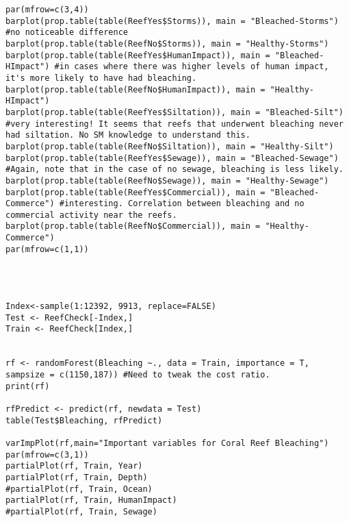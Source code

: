 \documentclass{article}
\begin{document}
\begin{verbatim}
par(mfrow=c(3,4))
barplot(prop.table(table(ReefYes$Storms)), main = "Bleached-Storms") #no noticeable difference
barplot(prop.table(table(ReefNo$Storms)), main = "Healthy-Storms")
barplot(prop.table(table(ReefYes$HumanImpact)), main = "Bleached-HImpact") #in cases where there was higher levels of human impact, it's more likely to have had bleaching.
barplot(prop.table(table(ReefNo$HumanImpact)), main = "Healthy-HImpact")
barplot(prop.table(table(ReefYes$Siltation)), main = "Bleached-Silt") #very interesting! It seems that reefs that underwent bleaching never had siltation. No SM knowledge to understand this.
barplot(prop.table(table(ReefNo$Siltation)), main = "Healthy-Silt")
barplot(prop.table(table(ReefYes$Sewage)), main = "Bleached-Sewage") #Again, note that in the case of no sewage, bleaching is less likely.
barplot(prop.table(table(ReefNo$Sewage)), main = "Healthy-Sewage")
barplot(prop.table(table(ReefYes$Commercial)), main = "Bleached-Commerce") #interesting. Correlation between bleaching and no commercial activity near the reefs. 
barplot(prop.table(table(ReefNo$Commercial)), main = "Healthy-Commerce")
par(mfrow=c(1,1))




Index<-sample(1:12392, 9913, replace=FALSE)
Test <- ReefCheck[-Index,]
Train <- ReefCheck[Index,]
  

rf <- randomForest(Bleaching ~., data = Train, importance = T, sampsize = c(1150,187)) #Need to tweak the cost ratio.
print(rf)

rfPredict <- predict(rf, newdata = Test)
table(Test$Bleaching, rfPredict)

varImpPlot(rf,main="Important variables for Coral Reef Bleaching")
par(mfrow=c(3,1))
partialPlot(rf, Train, Year)
partialPlot(rf, Train, Depth)
#partialPlot(rf, Train, Ocean)
partialPlot(rf, Train, HumanImpact)
#partialPlot(rf, Train, Sewage)

\end{verbatim}
\end{document}
